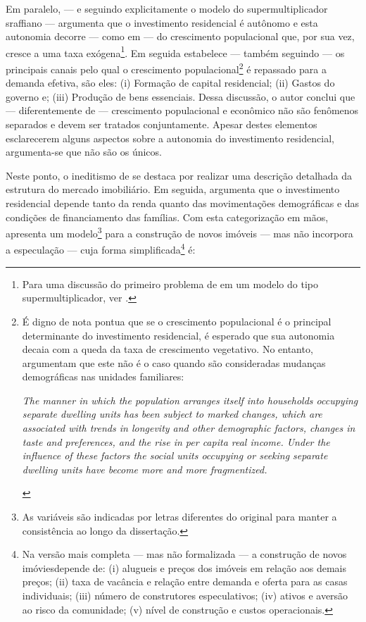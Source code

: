 Em paralelo, --- e seguindo explicitamente o modelo do supermultiplicador sraffiano --- \textcite{gowans_introducing_2014} argumenta que o investimento residencial é autônomo e esta autonomia decorre --- como em \textcite{hansen_economic_1939} --- do crescimento populacional que, por sua vez, cresce a uma taxa exógena\footnote{
	Para uma discussão do primeiro problema de \textcite{harrod_essay_1939} em um modelo do tipo supermultiplicador, ver \textcite{allain_demographic_2018}.
}.
Em seguida estabelece --- também seguindo \textcite{hansen_economic_1939} --- os principais canais pelo qual o crescimento populacional\footnote{
É digno de nota pontua que se o crescimento populacional é o principal determinante do investimento residencial, é esperado que sua autonomia decaia com a queda da taxa de crescimento vegetativo.
No entanto,  \textcite[p.~11]{grebler_capital_1956} argumentam que este não é o caso quando são consideradas mudanças demográficas nas unidades familiares:

\begin{citacao}
	\textit{The manner in which the population arranges itself into households
		occupying separate dwelling units has been subject to marked changes,
		which are associated with trends in longevity and other demographic
		factors, changes in taste and preferences, and the rise in per capita real
		income. Under the influence of these factors the social units occupying
		or seeking separate dwelling units have become more and more fragmentized.}
\end{citacao}
} é repassado para a demanda efetiva, são eles: (i) Formação de capital residencial; (ii) Gastos do governo e; (iii) Produção de bens essenciais.
Dessa discussão, o autor conclui que --- diferentemente de \textcite{robinson_model_1962} --- crescimento populacional e econômico não são fenômenos separados e devem ser tratados conjuntamente.
Apesar destes elementos esclarecerem alguns aspectos sobre a autonomia do investimento residencial, argumenta-se que não são os únicos.

Neste ponto, o ineditismo de \textcite{duesenberry_investment_1958} se destaca por realizar uma descrição detalhada da estrutura do mercado imobiliário.
Em seguida, argumenta que o investimento residencial depende tanto da renda quanto das movimentações demográficas e das condições de financiamento das famílias.
Com esta categorização em mãos, \textcite{duesenberry_investment_1958} apresenta um modelo\footnote{As variáveis são indicadas por letras diferentes do original para manter a consistência ao longo da dissertação.} para a construção de novos imóveis --- mas não incorpora a especulação --- cuja forma simplificada\footnote{
	Na versão mais completa --- mas não formalizada --- a construção de novos imóviesdepende de: (i) alugueis e preços dos imóveis em relação aos demais preços; (ii) taxa de vacância e relação entre demanda e oferta para as casas individuais; (iii) número de construtores especulativos; (iv) ativos e aversão ao risco da comunidade; (v) nível de construção e custos operacionais.} é:

